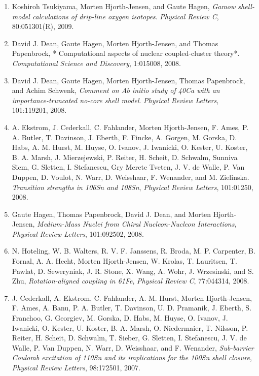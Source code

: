 \documentclass[%
oneside,                 %
final,                   %
10pt]{article}
\begin{document}
\begin{enumerate}
\item Koshiroh Tsukiyama, Morten Hjorth-Jensen, and Gaute Hagen,  \emph{Gamow shell-model calculations of drip-line oxygen isotopes}.  \emph{Physical Review C}, 80:051301(R), 2009. 

\item David J. Dean, Gaute Hagen, Morten Hjorth-Jensen, and Thomas Papenbrock,  * Computational aspects of nuclear coupled-cluster theory*.  \emph{Computational Science and Discovery}, 1:015008, 2008. 

\item David J. Dean, Gaute Hagen, Morten Hjorth-Jensen, Thomas Papenbrock, and Achim Schwenk,  \emph{Comment on Ab initio study of 40Ca with an   importance-truncated no-core shell model}.  \emph{Physical Review Letters}, 101:119201, 2008. 

\item A. Ekstrom, J. Cederkall, C. Fahlander, Morten Hjorth-Jensen, F. Ames, P. A.   Butler, T. Davinson, J. Eberth, F. Fincke, A. Gorgen, M. Gorska, D. Habs,   A. M. Hurst, M. Huyse, O. Ivanov, J. Iwanicki, O. Kester, U. Koster, B. A.   Marsh, J. Mierzejewski, P. Reiter, H. Scheit, D. Schwalm, Sunniva Siem,   G. Sletten, I. Stefanescu, Gry Merete Tveten, J. V. de Walle, P. Van Duppen,   D. Voulot, N. Warr, D. Weisshaar, F. Wenander, and M. Zielinska.  \emph{Transition strengths in 106Sn and 108Sn},  \emph{Physical Review Letters}, 101:01250, 2008. 

\item Gaute Hagen, Thomas Papenbrock, David J. Dean, and Morten Hjorth-Jensen,  \emph{Medium-Mass Nuclei from Chiral Nucleon-Nucleon Interactions},  \emph{Physical Review Letters}, 101:092502, 2008. 

\item N. Hoteling, W. B. Walters, R. V. F. Janssens, R. Broda, M. P. Carpenter,   B. Fornal, A. A. Hecht, Morten Hjorth-Jensen, W. Krolas, T. Lauritsen,   T. Pawlat, D. Seweryniak, J. R. Stone, X. Wang, A. Wohr, J. Wrzesinski, and   S. Zhu,  \emph{Rotation-aligned coupling in 61Fe},  \emph{Physical Review C}, 77:044314, 2008. 

\item J. Cederkall, A. Ekstrom, C. Fahlander, A. M. Hurst, Morten Hjorth-Jensen,   F. Ames, A. Banu, P. A. Butler, T. Davinson, U. D. Pramanik, J. Eberth,   S. Franchoo, G. Georgiev, M. Gorska, D. Habs, M. Huyse, O. Ivanov,   J. Iwanicki, O. Kester, U. Koster, B. A. Marsh, O. Niedermaier, T. Nilsson,   P. Reiter, H. Scheit, D. Schwalm, T. Sieber, G. Sletten, I. Stefanescu, J. V.   de Walle, P. Van Duppen, N. Warr, D. Weisshaar, and F. Wenander, \emph{Sub-barrier Coulomb excitation of 110Sn and its   implications for the 100Sn shell closure},  \emph{Physical Review Letters}, 98:172501, 2007. 


\end{enumerate}
\end{document}
